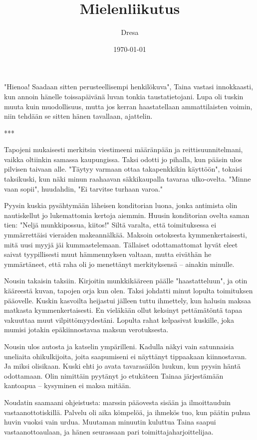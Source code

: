 ﻿\documentclass[a4paper, 12pt, finnish]{article}
\title{Mielenliikutus}
\author{Dresa}
\date{\today}
\begin{document}
\maketitle 

"Hienoa! Saadaan sitten perusteellisempi henkilökuva", Taina vastasi
innokkaasti, kun annoin hänelle toissapäivänä luvan tonkia
taustatietojani. Lupa oli tuskin muuta kuin muodollisuus,
mutta jos kerran haastatellaan ammattilaisten voimin,
niin tehdään se sitten hänen tavallaan, ajattelin. 

***

Tapojeni mukaisesti merkitsin viestimeeni määränpään ja
reittisuunnitelmani, vaikka oltiinkin samassa kaupungissa.
Taksi odotti jo pihalla, kun pääsin ulos pilvisen taivaan alle.
"Täytyy varmaan ottaa takapenkkikin käyttöön", tokaisi taksikuski,
kun näki minun raahaavan säkkikaupalla tavaraa ulko-ovelta.
"Minne vaan sopii", huudahdin, "Ei tarvitse turhaan varoa."

Pyysin kuskia pysähtymään läheisen konditorian luona,
jonka antimista olin nautiskellut jo lukemattomia kertoja aiemmin.
Huusin konditorian ovelta saman tien: "Neljä munkkipossua, kiitos!"
Siltä varalta, että toimituksessa ei ymmärrettäisi vieraiden makeannälkää.
Maksoin ostoksesta kymmenkertaisesti, mitä uusi myyjä jäi kummastelemaan.
Tällaiset odottamattomat hyvät eleet saivat tyypillisesti
muut hämmennyksen valtaan, mutta eiväthän he ymmärtäneet,
että raha oli jo menettänyt merkityksensä -- ainakin minulle.

Nousin takaisin taksiin. Kirjoitin munkkikääreen päälle "haastatteluun",
ja otin kääreestä kuvan, tapojen orja kun olen.
Taksi johdatti minut lopulta toimituksen pääovelle. Kuskin kasvoilta
heijastui jälleen tuttu ihmettely, kun halusin maksaa matkasta
kymmenkertaisesti. En vieläkään ollut keksinyt pettämätöntä tapaa
vakuuttaa muut vilpittömyydestäni. Lopulta rahat kelpasivat kuskille,
joka mumisi jotakin epäkiinnostavaa maksun verotuksesta.
 
Nousin ulos autosta ja katselin ympärilleni. Kadulla näkyi vain
satunnaisia uneliaita ohikulkijoita, joita saapumiseni ei näyttänyt
tippaakaan kiinnostavan. Ja miksi olisikaan. Kuski ehti jo avata
tavarasäilön luukun, kun pyysin häntä odottamaan. Olin nimittäin
pyytänyt jo etukäteen Tainaa järjestämään kantoapua -- kysyminen ei
maksa mitään.

Noudatin saamaani ohjeistusta: marssin pääovesta sisään ja
ilmoittauduin vastaanottotiskillä. Palvelu oli aika kömpelöä,
ja ihmekös tuo, kun päätin puhua huvin vuoksi
vain urdua. Muutaman minuutin kuluttua Taina saapui vastaanottoaulaan,
ja hänen seurassaan pari toimittajaharjoittelijaa.
\end{document}
